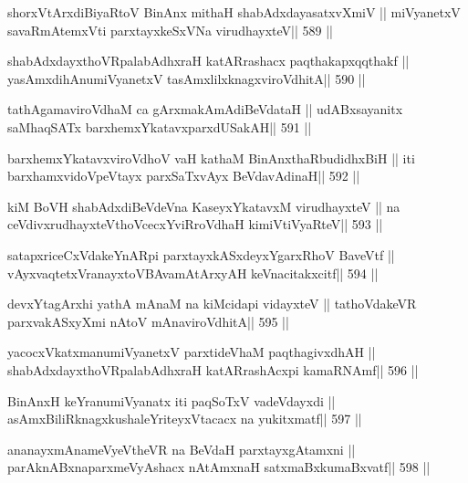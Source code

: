 \begin{shl}
shorxVtArxdiBiyaRtoV BinAnx mithaH shabAdxdayasatxvXmiV ||
miVyanetxV savaRmAtemxVti parxtayxkeSxVNa virudhayxteV\hfill || 589 ||
\end{shl}

\begin{shl}
shabAdxdayxthoVRpalabAdhxraH katARrashacx paqthakapxqqthakf ||
yasAmxdihAnumiVyanetxV tasAmxlilxknagxviroVdhitA\hfill || 590 ||
\end{shl}

\begin{shl}
tathA\s\s gamaviroVdhaM ca gArxmakAmAdiBeVdataH ||
udABxsayanitx saMhaqSATx barxhemxYkatavxparxdUSakAH\hfill || 591 ||
\end{shl}

\begin{shl}
barxhemxYkatavxviroVdhoV vaH kathaM BinAnxthaRbudidhxBiH ||
iti barxhamxvidoVpeVtayx parxSaTxvAyx BeVdavAdinaH\hfill || 592 ||
\end{shl}

\begin{shl}
kiM BoVH shabAdxdiBeVdeVna KaseyxYkatavxM virudhayxteV ||
na ceVdivxrudhayxteV\s thoVcecxYviRroVdhaH kimiVtiVyaRteV\hfill || 593 ||
\end{shl}

\begin{shl}
satapxriceCxVdakeYnARpi parxtayxkASxdeyxYgarxRhoV BaveVtf ||
vAyxvaqtetxVranayxtoVBAvamAtArxyAH keVnacitakxcitf\hfill || 594 ||
\end{shl}

\begin{shl}
devxYtagArxhi yathA mAnaM na kiMcidapi vidayxteV ||
tathoVdakeVR parxvakASxyXmi nAtoV mAnaviroVdhitA\hfill || 595 ||
\end{shl}

\begin{shl}
yacocxVkatxmanumiVyanetxV parxtideVhaM paqthagivxdhAH ||
shabAdxdayxthoVRpalabAdhxraH katARrashAcxpi kamaRNAmf\hfill || 596 ||
\end{shl}

\begin{shl}
BinAnxH keYranumiVyanatx iti paqSoTxV vadeVdayxdi ||
asAmxBiliRknagxkushaleYriteyxVtacacx na yukitxmatf\hfill || 597 ||
\end{shl}

\begin{shl}
ananayxmAnameVyeV\s theVR na BeVdaH parxtayxgAtamxni ||
parAknABxnaparxmeVyAshacx nA\s\s tAmxnaH satxmaBxkumaBxvatf\hfill || 598 ||
\end{shl}

